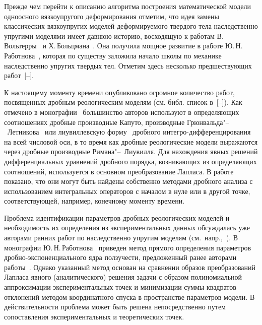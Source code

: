 \documentclass[11pt,a4paper,twoside]{article}
\begin{document}
 


Прежде чем перейти к описанию алгоритма построения математической модели одноосного вязкоупругого деформирования отметим, что идея замены классических вязкоупругих моделей деформируемого твердого тела наследственно упругими моделями имеет давнюю историю, восходящую к работам В.\,Вольтерры~\cite{Volterra1909, Volterra1982} и Х.\,Больцмана~\cite{Boltzman}. Она получила мощное развитие в работе Ю.\,Н.\,Работнова~\cite{Rabotnov1948}, которая по существу заложила начало школы по механике наследственно упругих твердых тел. Отметим здесь несколько предшествующих работ~[--].





К настоящему моменту времени опубликовано огромное количество работ, посвященных дробным реологическим моделям (см. библ. список в~[--]). Как отмечено в монографии~\cite[с.~443]{K-S-T} большинство авторов используют в определяющих соотношениях дробные производные Капуто, производные Грюнвальда"--~Летникова~\cite{Schmidt} или лиувиллевскую форму~\cite{Lewandowski} дробного интегро-дифференцирования на всей числовой оси, в то время как дробные реологические модели выражаются через дробные производные Римана"--~Лиувилля. Для нахождения явных решений дифференциальных уравнений дробного порядка, возникающих из определяющих соотношений, используется в основном преобразование Лапласа. В работе~\cite{OgoRadUng16} показано, что они могут быть найдены собственно методами дробного анализа с использованием интегральных операторов с началом в нуле или в другой точке, соответствующей, например, конечному моменту времени.





Проблема идентификации параметров дробных реологических моделей и необходимость их определения  из экспериментальных данных обсуждалась уже авторами ранних работ по наследственно упругим моделям (см.~напр.,~\cite{Gemant1936}). В монографии Ю.\,Н.\,Работнова~\cite[с.~86]{Rabotnov1977} приведен метод прямого определения параметров дробно-экспоненциального ядра ползучести, предложенный ранее авторами работы~\cite{Zvonov1968}. Однако указанный метод основан на сравнении образов преобразований Лапласа явного (аналитического) решения задачи с образом полиномиальной аппроксимации экспериментальных точек и минимизации суммы квадратов отклонений методом координатного спуска в пространстве параметров модели. В действительности проблема может быть решена непосредственно путем сопоставления экспериментальных и теоретических точек.
\end{document}
